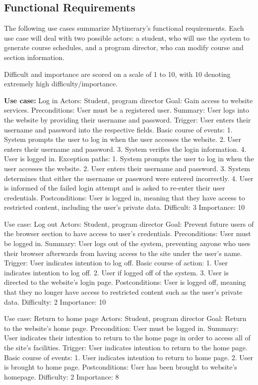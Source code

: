 \documentclass[12pt]{article}
\begin{document}
\subsection{Functional Requirements}
The following use cases summarize Mytinerary's functional requirements. Each
use case will deal with two possible actors: a student, who will use the
system to generate course schedules, and a program director, who can modify
course and section information.

Difficult and importance are scored on a scale of 1 to 10, with 10 denoting
extremely high difficulty/importance.


\textbf{Use case:} Log in
Actors: Student, program director
Goal: Gain access to website services.
Preconditions: User must be a registered user.
Summary: User logs into the website by providing their username and password.
Trigger: User enters their username and password into the respective fields.
Basic course of events:
1. System prompts the user to log in when the user accesses the website.
2. User enters their username and password.
3. System verifies the login information.
4. User is logged in.
Exception paths:
1. System prompts the user to log in when the user accesses the website.
2. User enters their username and password.
3. System determines that either the username or password were entered incorrectly.
4. User is informed of the failed login attempt and is asked to re-enter their
user credentials.
Postconditions: User is logged in, meaning that they have access to restricted content,
including the user's private data.
Difficult: 3
Importance: 10


Use case: Log out
Actors: Student, program director
Goal: Prevent future users of the browser section to have access to user's credentials.
Preconditions: User must be logged in.
Summary: User logs out of the system, preventing anyone who uses their browser
afterwards from having access to the site under the user's name.
Trigger: User indicates intention to log off.
Basic course of action:
1. User indicates intention to log off.
2. User if logged off of the system.
3. User is directed to the website's login page.
Postconditions: User is logged off, meaning that they no longer have access
to restricted content such as the user's private data.
Difficulty: 2
Importance: 10


Use case: Return to home page
Actors: Student, program director
Goal: Return to the website's home page.
Precondition: User must be logged in.
Summary: User indicates their intention to return to the home page in order to
access all of the site's facilities.
Trigger: User indicates intention to return to the home page.
Basic course of events:
1. User indicates intention to return to home page.
2. User is brought to home page.
Postconditions: User has been brought to website's homepage.
Difficulty: 2
Importance: 8
\end{document}
